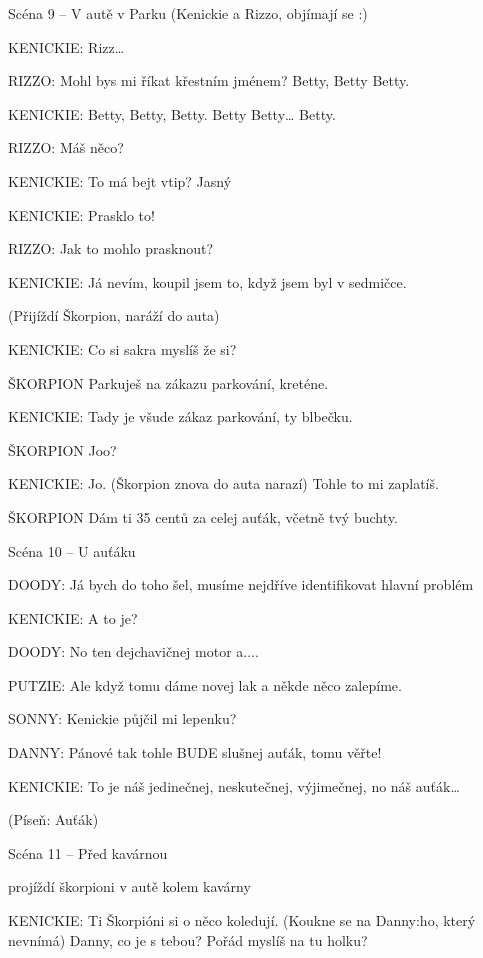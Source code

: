 Scéna 9 – V autě v Parku (Kenickie a Rizzo, objímají se :)

\rep KENICKIE:        Rizz…

\rep RIZZO:        Mohl bys mi říkat křestním jménem? Betty, Betty Betty.

\rep KENICKIE:        Betty, Betty, Betty. Betty Betty… Betty.

\rep RIZZO:        Máš něco?

\rep KENICKIE:        To má bejt vtip? Jasný

\rep KENICKIE:        Prasklo to!

\rep RIZZO:        Jak to mohlo prasknout?

\rep KENICKIE:        Já nevím, koupil jsem to, když jsem byl v sedmičce.

(Přijíždí Škorpion, naráží do auta)

\rep KENICKIE:        Co si sakra myslíš že si?

ŠKORPION        Parkuješ na zákazu parkování, kreténe.

\rep KENICKIE:        Tady je všude zákaz parkování, ty blbečku.

ŠKORPION        Joo?

\rep KENICKIE:        Jo. (Škorpion znova do auta narazí) Tohle to mi zaplatíš.

ŠKORPION        Dám ti 35 centů za celej auťák, včetně tvý buchty.

Scéna 10 – U auťáku

\rep DOODY:        Já bych do toho šel, musíme nejdříve identifikovat hlavní problém

\rep KENICKIE:        A to je?

\rep DOODY:        No ten dejchavičnej motor a.... 

\rep PUTZIE:         Ale když tomu dáme novej lak a někde něco zalepíme. 

\rep SONNY:        Kenickie půjčil mi lepenku? 

\rep DANNY:         Pánové tak tohle BUDE  slušnej auťák, tomu věřte!

\rep KENICKIE:        To je náš jedinečnej, neskutečnej, výjimečnej, no náš auťák…

                 (Píseň: Auťák) 

Scéna 11 – Před kavárnou 

projíždí škorpioni v autě kolem kavárny 

\rep KENICKIE:         Ti Škorpióni si o něco koledují. (Koukne se na \rep Danny:ho, který nevnímá)                 Danny, co je s tebou? Pořád myslíš na tu holku?

